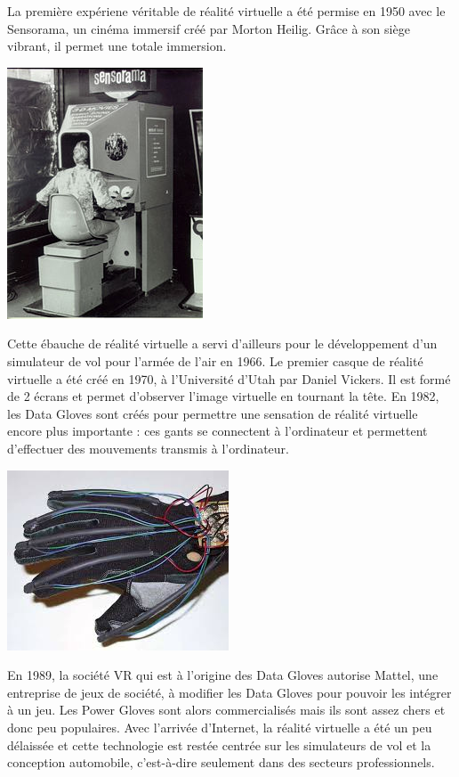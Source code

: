 \documentclass[12pt, a4paper]{report}
\begin{document}
La première expériene véritable de réalité virtuelle a été permise en 1950 avec le Sensorama, un cinéma immersif créé par Morton Heilig. Grâce à son siège vibrant, il permet une totale immersion.
\begin{center}
\includegraphics[scale=0.27]{sensorama.jpg}
\end{center}



Cette ébauche de réalité virtuelle a servi d'ailleurs pour le développement d'un simulateur de vol pour l'armée de l'air en 1966. Le premier casque de réalité virtuelle a été créé en 1970, à l'Université d'Utah par Daniel Vickers. Il est formé de 2 écrans et permet d'observer l'image virtuelle en tournant la tête.
En 1982, les Data Gloves sont créés pour permettre une sensation de réalité virtuelle encore plus importante : ces gants se connectent à l'ordinateur et permettent d'effectuer des mouvements transmis à l'ordinateur.

\begin{center}
\includegraphics[scale=0.4]{data.jpeg}
\end{center}

En 1989, la société VR qui est à l'origine des Data Gloves autorise Mattel, une entreprise de jeux de société, à modifier les Data Gloves pour pouvoir les intégrer à un jeu. Les Power Gloves sont alors commercialisés mais ils sont assez chers et donc peu populaires.
Avec l'arrivée d'Internet, la réalité virtuelle a été un peu délaissée et cette technologie est restée centrée sur les simulateurs de vol et la conception automobile, c'est-à-dire seulement dans des secteurs professionnels.
\end{document}
